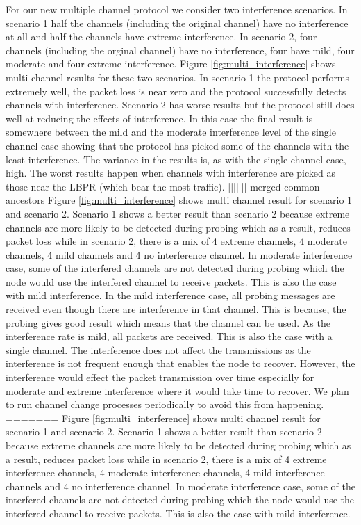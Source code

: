 For our new multiple channel protocol we consider two interference scenarios.
In scenario 1 half the channels (including the original channel) have no
interference at all and half the channels have extreme interference.
In scenario 2, four channels (including the orginal channel) have no
interference, four have mild, four moderate and four extreme interference.
Figure \ref{fig:multi_interference} shows multi channel results for these
two scenarios.  In scenario 1 the protocol performs extremely well, the packet
loss is near zero and the protocol successfully detects channels with interference.
Scenario 2 has worse results but the protocol still does well at reducing the
effects of interference.  In this case the final result is somewhere between
the mild and the moderate interference level of the single channel case
showing that the protocol has picked some of the channels with the least interference.
The variance in the results is, as with the single channel case, high.  The worst
results happen when channels with interference are picked as those near the
LBPR (which bear the most traffic).   
||||||| merged common ancestors
Figure \ref{fig:multi_interference} shows multi channel result for scenario 1 and scenario 2. Scenario 1 shows a better result than scenario 2 because extreme channels are more likely to be detected during probing which as a result, reduces packet loss while in scenario 2, there is a mix of 4 extreme channels, 4 moderate channels, 4 mild channels and 4 no interference channel. In moderate interference case, some of the interfered channels are not detected during probing which the node would use the interfered channel to receive packets. This is also the case with mild interference.
In the mild interference case, all probing messages are received even though there are interference in that channel. This is because, the probing gives good result which means that the channel can be used. As the interference rate is mild, all packets are received. This is also the case with a single channel. The interference does not affect the transmissions as the interference is not frequent enough that enables the node to recover. However, the interference would effect the packet transmission over time especially for moderate and extreme interference where it would take time to recover. We plan to run channel change processes periodically to avoid this from happening. %
=======
Figure \ref{fig:multi_interference} shows multi channel result for scenario 1 and scenario 2. Scenario 1 shows a better result than scenario 2 because extreme channels are more likely to be detected during probing which as a result, reduces packet loss while in scenario 2, there is a mix of 4 extreme interference channels, 4 moderate interference channels, 4 mild interference channels and 4 no interference channel. In moderate interference case, some of the interfered channels are not detected during probing which the node would use the interfered channel to receive packets. This is also the case with mild interference.
